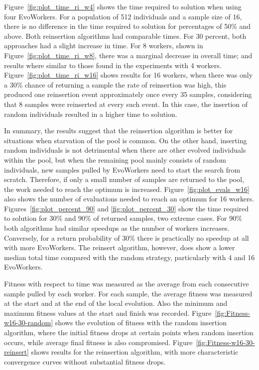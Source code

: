 Figure~\ref{fig:plot_time_ri_w4} shows the time required 
to solution when using four EvoWorkers. For a population of
512 individuals and a sample size of 16, there is no
difference in the time required to solution for 
percentages of 50\% and above. Both reinsertion algorithms
had comparable times. For 30 percent, both approaches 
had a slight increase in time. For 8 workers, shown in Figure~\ref{fig:plot_time_ri_w8},  there was a marginal
decrease in overall time; and results where similar to those found in the experiments with 4 workers.  
Figure~\ref{fig:plot_time_ri_w16} shows results for 16 workers,
when there was only a 30\% chance of returning a sample the rate of reinsertion was high, this produced one reinsertion event approximately once every 35 samples,
considering that 8 samples were reinserted at every such event.
In this case, the insertion of random individuals resulted in a higher time to solution.

In summary, the results suggest that the reinsertion algorithm is better
for situations when starvation of the pool is common.
On the other hand, inserting random individuals is not detrimental when there
are other evolved individuals within the pool, but when the remaining
pool mainly consists of random individuals, new samples pulled by EvoWorkers need to start the search from scratch. 
Therefore, if only a small number of samples are returned to the pool, the work needed to reach the
optimum is increased. Figure~\ref{fig:plot_evals_w16} also shows the number 
of evaluations needed to reach an optimum for 16 workers.
Figures~\ref{fig:plot_percent_90} and \ref{fig:plot_percent_30} show
the time required to solution for 30\% and 90\% of returned samples, two extreme cases.
For 90\% both algorithms had similar speedups as the number of workers increases.
Conversely, for a return probability of 30\% there is practically no speedup at all with more EvoWorkers.
The reinsert algorithm, however, does show a lower median total time compared with the random strategy, particularly with 4 and 16 EvoWorkers.         

Fitness with respect to time was measured as the average from each consecutive
sample pulled by each worker. For each sample, the average fitness
was measured at the start and at the end of the local evolution.
Also the minimum and maximum fitness values at the start and finish was recorded.    
Figure~\ref{fig:Fitness-w16-30-random} shows the evolution of fitness
with the random insertion algorithm, where the initial fitness drops
at certain points when random insertion occurs, while average final fitness 
is also compromised. Figure~\ref{fig:Fitness-w16-30-reinsert}
shows results for the reinsertion algorithm, with more
characteristic convergence curves without substantial fitness drops. 





